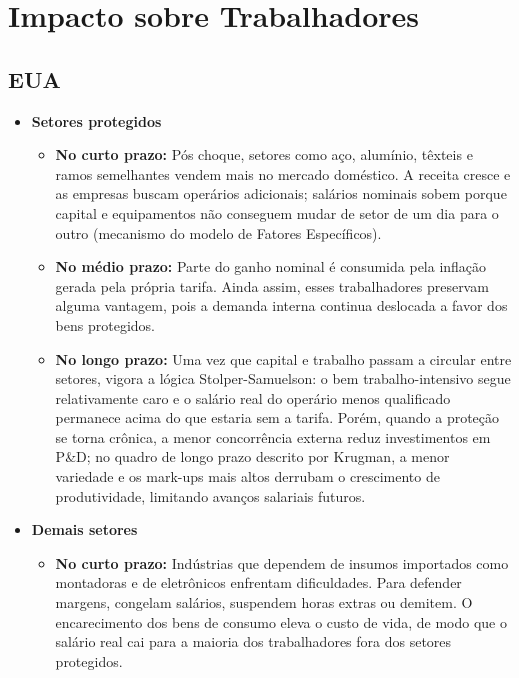 \documentclass[a4paper,12pt]{article}[abntex2]
\begin{document}
\section*{\textbf{Impacto sobre Trabalhadores}}

\subsection*{\textbf{EUA}}

\begin{itemize}
  \item \textbf{Setores protegidos} 
  \begin{itemize}
    \item \textbf{No curto prazo:} Pós choque, setores como aço, alumínio, têxteis e ramos semelhantes vendem mais no mercado doméstico. A receita cresce e as empresas buscam operários adicionais; salários nominais sobem porque capital e equipamentos não conseguem mudar de setor de um dia para o outro (mecanismo do modelo de Fatores Específicos).
    
    \item \textbf{No médio prazo:} Parte do ganho nominal é consumida pela inflação gerada pela própria tarifa. Ainda assim, esses trabalhadores preservam alguma vantagem, pois a demanda interna continua deslocada a favor dos bens protegidos.
    
    \item \textbf{No longo prazo:} Uma vez que capital e trabalho passam a circular entre setores, vigora a lógica Stolper-Samuelson: o bem trabalho-intensivo segue relativamente caro e o salário real do operário menos qualificado permanece acima do que estaria sem a tarifa. Porém, quando a proteção se torna crônica, a menor concorrência externa reduz investimentos em P\&D; no quadro de longo prazo descrito por Krugman, a menor variedade e os mark-ups mais altos derrubam o crescimento de produtividade, limitando avanços salariais futuros.
  \end{itemize}
  
  \item \textbf{Demais setores} 
  \begin{itemize}
    \item \textbf{No curto prazo:} Indústrias que dependem de insumos importados como montadoras e de eletrônicos enfrentam dificuldades. Para defender margens, congelam salários, suspendem horas extras ou demitem. O encarecimento dos bens de consumo eleva o custo de vida, de modo que o salário real cai para a maioria dos trabalhadores fora dos setores protegidos.
    

\end{itemize}
\end{itemize}
\end{document}
